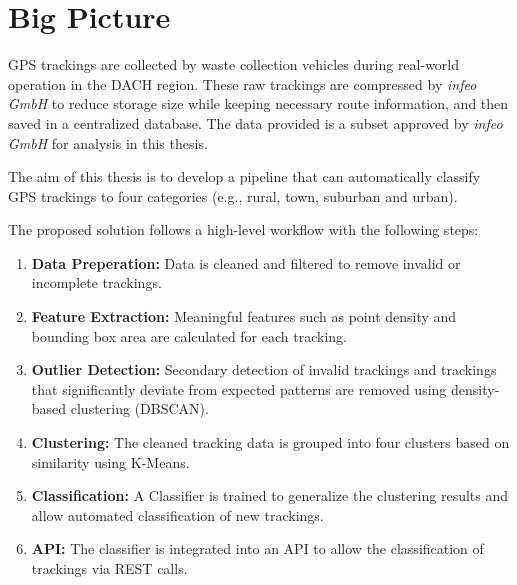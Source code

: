 \documentclass[a4paper,12pt,twoside]{scrreprt}
\begin{document}
\section{Big Picture}

GPS trackings are collected by waste collection vehicles during real-world
operation in the DACH region.
These raw trackings are compressed by \textit{infeo GmbH} to reduce storage
size while
keeping necessary route information, and then saved in a centralized database.
The data provided is a subset approved by \textit{infeo GmbH} for analysis in
this thesis.

The aim of this thesis is to develop a pipeline that can automatically classify
GPS trackings to four categories (e.g., rural, town, suburban and urban).

The proposed solution follows a high-level workflow with the following steps:

\begin{enumerate}
  \item \textbf{Data Preperation:} Data is cleaned and filtered to remove
        invalid or incomplete trackings.
  \item \textbf{Feature Extraction:} Meaningful features such as point density
        and bounding box area are calculated for each tracking.
  \item \textbf{Outlier Detection:} Secondary detection of invalid trackings
        and trackings that significantly deviate from expected patterns are
        removed
        using density-based clustering (DBSCAN).
  \item \textbf{Clustering:} The cleaned tracking data is grouped into four
        clusters based on similarity using K-Means.
  \item \textbf{Classification:} A Classifier is trained to generalize the
        clustering results and allow automated classification of new trackings.
  \item \textbf{API:} The classifier is integrated into an API to allow the
        classification of trackings via REST calls.
\end{enumerate}
\end{document}
